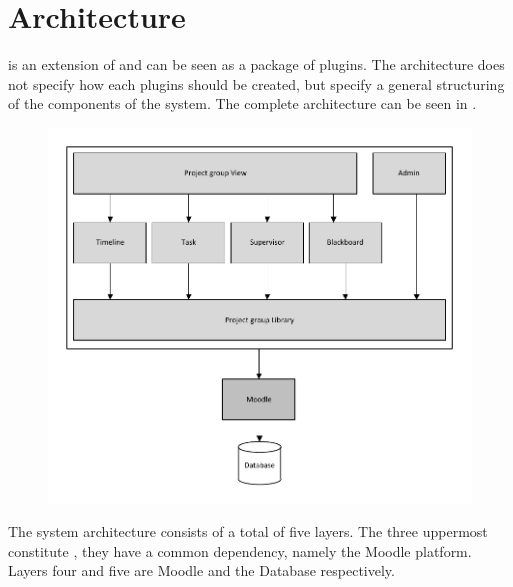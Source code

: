\section{Architecture}
\label{sec:architecture}
\system{} is an extension of \moodle{} and can be seen as a package of plugins. 
The architecture does not specify how each plugins should be created, but specify a general structuring of the components of the system. 
The complete architecture can be seen in .
\begin{figure}[h!t]
	\centering
		\includegraphics{images/architecture.pdf}
	\label{fig:architecture}
\end{figure}

The system architecture consists of a total of five layers. 
The three uppermost constitute \system{}, they have a common dependency, namely the Moodle platform. 
Layers four and five are Moodle and the Database respectively.

